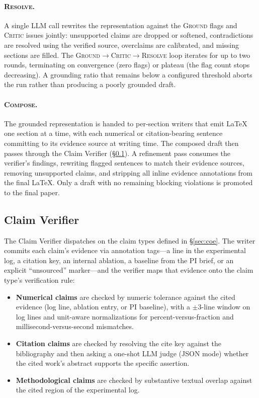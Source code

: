 \paragraph{\textsc{Resolve}.}
A single LLM call rewrites the representation against the \textsc{Ground} flags and \textsc{Critic} issues jointly: unsupported claims are dropped or softened, contradictions are resolved using the verified source, overclaims are calibrated, and missing sections are filled. The \textsc{Ground}$\to$\textsc{Critic}$\to$\textsc{Resolve} loop iterates for up to two rounds, terminating on convergence (zero flags) or plateau (the flag count stops decreasing). A grounding ratio that remains below a configured threshold aborts the run rather than producing a poorly grounded draft.

\paragraph{\textsc{Compose}.}
The grounded representation is handed to per-section writers that emit \LaTeX{} one section at a time, with each numerical or citation-bearing sentence committing to its evidence source at writing time. The composed draft then passes through the Claim Verifier (\S\ref{app:claim_verifier_rules}). A refinement pass consumes the verifier's findings, rewriting flagged sentences to match their evidence sources, removing unsupported claims, and stripping all inline evidence annotations from the final \LaTeX{}. Only a draft with no remaining blocking violations is promoted to the final paper.

\subsection{Claim Verifier}
\label{app:claim_verifier_rules}

The Claim Verifier dispatches on the claim types defined in \S\ref{sec:coe}.
The writer commits each claim's evidence via annotation tags---a line in the experimental log, a citation key, an internal ablation, a baseline from the PI brief, or an explicit ``unsourced'' marker---and the verifier maps that evidence onto the claim type's verification rule:

\begin{itemize}\itemsep2pt \parskip0pt
  \item \textbf{Numerical claims} are checked by numeric tolerance against the cited evidence (log line, ablation entry, or PI baseline), with a $\pm 3$-line window on log lines and unit-aware normalizations for percent-versus-fraction and millisecond-versus-second mismatches.
  \item \textbf{Citation claims} are checked by resolving the cite key against the bibliography and then asking a one-shot LLM judge (JSON mode) whether the cited work's abstract supports the specific assertion.
  \item \textbf{Methodological claims} are checked by substantive textual overlap against the cited region of the experimental log.
\end{itemize}

